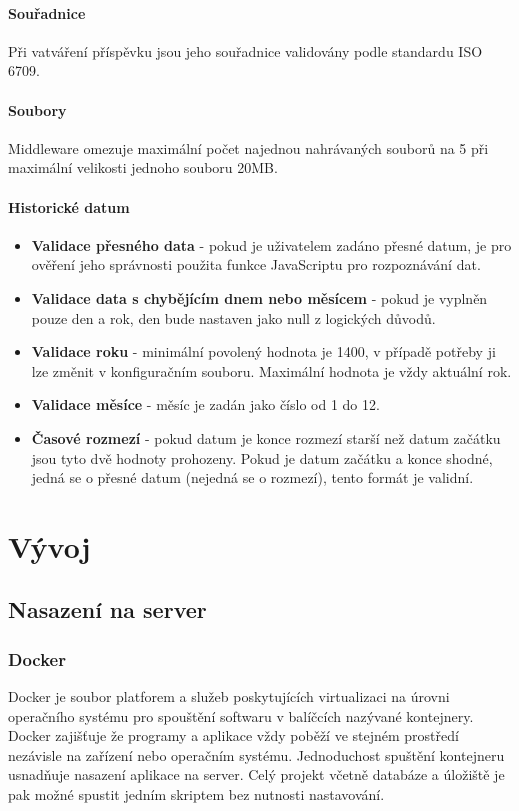 \documentclass[12pt, a4paper,
 twoside,        %
 openright
]{report}
\begin{document}
\subsubsection{Souřadnice} Při vatváření příspěvku jsou jeho souřadnice validovány podle standardu ISO 6709.
\subsubsection{Soubory} Middleware omezuje maximální počet najednou nahrávaných souborů na 5 při maximální velikosti jednoho souboru 20MB.
\subsubsection{Historické datum}
\begin{itemize}
	\item \textbf{Validace přesného data} - pokud je uživatelem zadáno přesné datum, je pro ověření jeho správnosti použita funkce JavaScriptu pro rozpoznávání dat.
	\item \textbf{Validace data s chybějícím dnem nebo měsícem} - pokud je vyplněn pouze den a rok, den bude nastaven jako null z logických důvodů.
	\item \textbf{Validace roku} - minimální povolený hodnota je 1400, v případě potřeby ji lze změnit v konfiguračním souboru. Maximální hodnota je vždy aktuální rok.
	\item \textbf{Validace měsíce} - měsíc je zadán jako číslo od 1 do 12.
	\item \textbf{Časové rozmezí} - pokud datum je konce rozmezí starší než datum začátku jsou tyto dvě hodnoty prohozeny. Pokud je datum začátku a konce shodné, jedná se o přesné datum (nejedná se o rozmezí), tento formát je validní.
\end{itemize}


\chapter{Vývoj}
\section{Nasazení na server}
\subsection{Docker}
Docker je soubor platforem a služeb poskytujících virtualizaci na úrovni operačního systému pro spouštění softwaru v balíčcích nazývané kontejnery. Docker zajišťuje že programy a aplikace vždy poběží ve stejném prostředí nezávisle na zařízení nebo operačním systému. Jednoduchost spuštění kontejneru usnadňuje nasazení aplikace na server. Celý projekt včetně databáze a úložiště je pak možné spustit jedním skriptem bez nutnosti nastavování.
\end{document}
